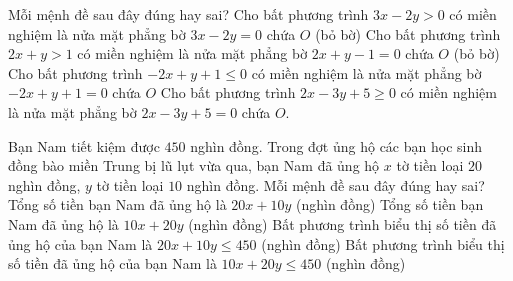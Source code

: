 \begin{ex}%
	Mỗi mệnh đề sau đây đúng hay sai?
	\choiceTF
	{Cho bất phương trình $3x-2y>0$ có miền nghiệm là nửa mặt phẳng bờ $3x-2y=0$  chứa $O$ (bỏ bờ)} 
	{Cho bất phương trình $2x+y>1$ có miền nghiệm là nửa mặt phẳng bờ $2x+y-1=0$ chứa $O$  (bỏ bờ)}
	{Cho bất phương trình $-2x+y+1\le 0$ có miền nghiệm là nửa mặt phẳng bờ $-2x+y+1=0$ chứa $O$}
	{
		\True Cho bất phương trình $2x-3y+5\ge 0$ có miền nghiệm là nửa mặt phẳng bờ $2x-3y+5= 0$ chứa $O$.}
\end{ex}

\begin{ex}%
	Bạn Nam tiết kiệm được $450$ nghìn đồng. Trong đợt ủng hộ các bạn học sinh đồng bào miền Trung bị lũ lụt vừa qua, bạn Nam đã ủng hộ $x$ tờ tiền loại $20$ nghìn đồng, $y$ tờ tiền loại $10$ nghìn đồng. Mỗi mệnh đề sau đây đúng hay sai?
	\choiceTF
	{\True Tổng số tiền bạn Nam đã ủng hộ là $20x+10y$ (nghìn đồng)}
	{Tổng số tiền bạn Nam đã ủng hộ là $10x+20y$ (nghìn đồng)}
	{\True Bất phương trình biểu thị số tiền đã ủng hộ của bạn Nam là  $20x+10y\le 450$ (nghìn đồng)}
	{Bất phương trình biểu thị số tiền đã ủng hộ của bạn Nam là  $10x+20y\le 450$ (nghìn đồng)}
\end{ex}

